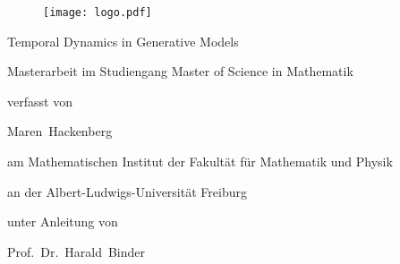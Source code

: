 \begin{titlepage}
\begin{center}
\begin{figure}[]
\texttt{[image: logo.pdf]}
\end{figure}
\vspace{0.3cm}                  

{\LARGE Temporal Dynamics in Generative Models}
\vspace{2.0cm}

Masterarbeit im Studiengang Master of Science in Mathematik

verfasst von

{\large Maren~Hackenberg} \vspace{1cm}

am Mathematischen Institut der Fakultät für Mathematik und Physik

an der Albert-Ludwigs-Universität Freiburg \vspace{1cm}

unter Anleitung von 

{\large Prof.~Dr.~Harald~Binder}



\end{center}
\end{titlepage}